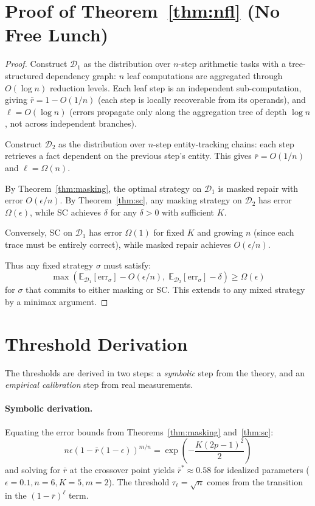 \documentclass{article}
\begin{document}
\section{Proof of Theorem~\ref{thm:nfl} (No Free Lunch)}
\label{app:proof_nfl}

\begin{proof}
Construct $\mathcal{D}_1$ as the distribution over $n$-step arithmetic tasks with a tree-structured dependency graph: $n$ leaf computations are aggregated through $O(\log n)$ reduction levels. Each leaf step is an independent sub-computation, giving $\bar{r} = 1 - O(1/n)$ (each step is locally recoverable from its operands), and $\ell = O(\log n)$ (errors propagate only along the aggregation tree of depth $\log n$, not across independent branches).

Construct $\mathcal{D}_2$ as the distribution over $n$-step entity-tracking chains: each step retrieves a fact dependent on the previous step's entity. This gives $\bar{r} = O(1/n)$ and $\ell = \Omega(n)$.

By Theorem~\ref{thm:masking}, the optimal strategy on $\mathcal{D}_1$ is masked repair with error $O(\epsilon/n)$. By Theorem~\ref{thm:sc}, any masking strategy on $\mathcal{D}_2$ has error $\Omega(\epsilon)$, while SC achieves $\delta$ for any $\delta > 0$ with sufficient $K$.

Conversely, SC on $\mathcal{D}_1$ has error $\Omega(1)$ for fixed $K$ and growing $n$ (since each trace must be entirely correct), while masked repair achieves $O(\epsilon/n)$.

Thus any fixed strategy $\sigma$ must satisfy:
\begin{equation}
\max\left(\mathbb{E}_{\mathcal{D}_1}[\text{err}_\sigma] - O(\epsilon/n),\; \mathbb{E}_{\mathcal{D}_2}[\text{err}_\sigma] - \delta\right) \geq \Omega(\epsilon)
\end{equation}
for $\sigma$ that commits to either masking or SC. This extends to any mixed strategy by a minimax argument.
\end{proof}

\section{Threshold Derivation}
\label{app:thresholds}

The thresholds are derived in two steps: a \emph{symbolic} step from the theory, and an \emph{empirical calibration} step from real measurements.

\paragraph{Symbolic derivation.} Equating the error bounds from Theorems~\ref{thm:masking} and~\ref{thm:sc}:
\begin{equation}
n\epsilon(1-\bar{r}(1-\epsilon))^{m/n} = \exp\left(-\frac{K(2p-1)^2}{2}\right)
\end{equation}
and solving for $\bar{r}$ at the crossover point yields $\bar{r}^* \approx 0.58$ for idealized parameters ($\epsilon = 0.1, n = 6, K = 5, m = 2$). The threshold $\tau_\ell = \sqrt{n}$ comes from the transition in the $(1-\bar{r})^\ell$ term.
\end{document}
